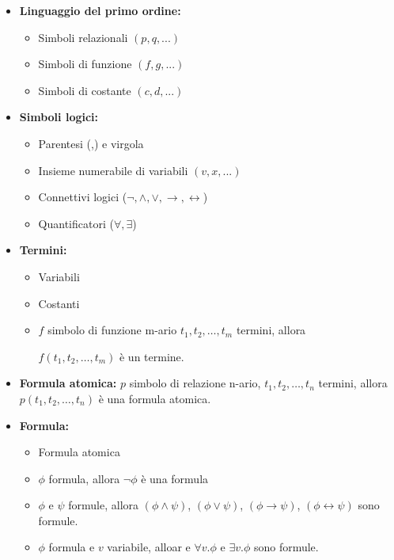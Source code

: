 \documentclass[a4paper]{article}
\begin{document}
\begin{itemize}
    \item \textbf{Linguaggio del primo ordine:} 
    \begin{itemize}
        \item Simboli relazionali $(p,q, ...)$
        \item Simboli di funzione $(f,g, ...)$
        \item Simboli di costante $(c,d, ...)$
    \end{itemize}
    \item \textbf{Simboli logici:}
    \begin{itemize}
        \item Parentesi (,) e virgola
        \item Insieme numerabile di variabili $(v,x,...)$
        \item Connettivi logici ($\neg, \land, \lor, \rightarrow, \leftrightarrow$)
        \item Quantificatori ($\forall, \exists$)
    \end{itemize}
    \item \textbf{Termini:}
        \begin{itemize}
            \item Variabili
            \item Costanti
            \item $f$ simbolo di funzione m-ario $t_1, t_2, \dots, t_m$ termini, allora

              $f(t_1, t_2, \dots, t_m)$ è un termine.
        \end{itemize}
    \item \textbf{Formula atomica:} $p$ simbolo di relazione n-ario, 
    $t_1,t_2,\dots,t_n$ 
    termini, allora $p(t_1,t_2,\dots,t_n)$ è una formula atomica.
    \item \textbf{Formula:}
    \begin{itemize}
        \item Formula atomica
        \item $\phi$ formula, allora $\neg \phi$ è una formula
        \item $\phi$ e $\psi$ formule, allora $(\phi \land \psi)$, $(\phi \lor \psi)$, $(\phi \rightarrow \psi)$, $(\phi \leftrightarrow \psi)$ sono formule.
        \item $\phi$ formula e $v$ variabile, alloar e $\forall v . \phi$ e $\exists v . \phi$ sono formule.
    \end{itemize}
\end{itemize}
\end{document}
